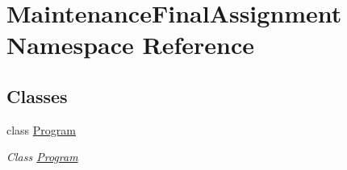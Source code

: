 \hypertarget{namespace_maintenance_final_assignment}{}\section{Maintenance\+Final\+Assignment Namespace Reference}
\label{namespace_maintenance_final_assignment}
\subsection*{Classes}
\begin{DoxyCompactItemize}
\item 
class \hyperlink{class_maintenance_final_assignment_1_1_program}{Program}
\begin{DoxyCompactList}\small\item\em Class \hyperlink{class_maintenance_final_assignment_1_1_program}{Program} \end{DoxyCompactList}\end{DoxyCompactItemize}
